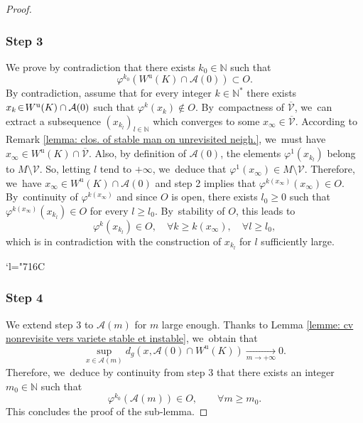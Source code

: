 \documentclass[11pt]{article}
\newcommand{\Changelback}{\mathcode`l="716C}
\newcommand{\ru}{\mathrm{u}}
\theoremstyle{definition}
\theoremstyle{plain}
\newcommand{\Acal}{\mathcal{A}}
\newcommand{\N}{\mathbb{N}}
\newcommand{\Vcal}{\mathcal{V}}
\begin{document}
\begin{proof}
\subsubsection*{Step 3} We prove by contradiction that there exists $k_0 \in \N$ such that
\[
\varphi^{k_0} (W^\ru (K) \cap \Acal(0)) \subset O.
\]
By contradiction, assume that for every integer $k \in \N^*$ there exists $x_k\!\in\! W^\ru (K) \cap\nobreak \Acal (0)$ such that $\varphi^{k} (x_k) \notin O$. By~compactness of $\overline{\Vcal}$, we~can extract a subsequence $(x_{k_l})_{l \in \N}$ which converges to some $x_{\infty} \in \overline{\Vcal}$. According to Remark \ref{lemma: clos. of stable man on unrevisited neigh.}, we~must have $x_{\infty} \in W^\ru (K) \cap \overline{\Vcal}$. Also, by definition of $\Acal (0)$, the elements $\varphi^1 (x_{k_l})$ belong to $M \setminus \Vcal$. So, letting $l$ tend to $+\infty$, we~deduce that $\varphi^1 (x_{\infty}) \in M \setminus \Vcal $. Therefore, we~have $x_{\infty} \in W^\ru (K) \cap \Acal (0)$ and step 2 implies that $\varphi^{k (x_{\infty})} (x_{\infty}) \in O$. By~continuity of $\varphi^{k (x_{\infty})}$ and since $O$ is open, there exists $l_0 \geq 0$ such that $\varphi^{k (x_{\infty})} (x_{k_l}) \in O$ for every $l \geq l_0$. By~stability of $O$, this leads to
\[
\varphi^{k} (x_{k_l}) \in O, \quad \forall k \geq k(x_{\infty}), \quad \forall l \geq l_0,
\]
which is in contradiction with the construction of $x_{k_l}$ for $l$ sufficiently large.

\Changelback

\subsubsection*{Step 4} We extend step 3 to $\Acal (m)$ for $m$ large enough. Thanks to Lemma \ref{lemme: cv nonrevisite vers variete stable et instable}, we~obtain that
\[
\sup_{x \in \Acal (m) } d_g \left(x, \Acal (0) \cap W^\ru(K) \right) \underset{m \to +\infty}{\to} 0.
\]
Therefore, we~deduce by continuity from step 3 that there exists an integer $m_0 \in \N$ such that
\begin{equation}\label{eq: lemme filtration cv uniform R(n)}
\varphi^{ k_0} (\Acal (m)) \in O, \qquad \forall m \geq m_0.
\end{equation}
This concludes the proof of the sub-lemma.
\end{proof}
\end{document}
